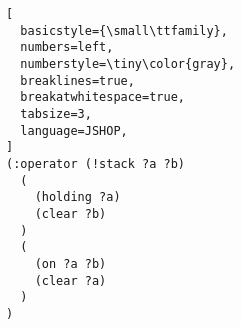 \begin{lstlisting}[
  basicstyle={\small\ttfamily},
  numbers=left,
  numberstyle=\tiny\color{gray},
  breaklines=true,
  breakatwhitespace=true,
  tabsize=3,
  language=JSHOP,
]
(:operator (!stack ?a ?b)
  (
    (holding ?a)
    (clear ?b)
  )
  (
    (on ?a ?b)
    (clear ?a)
  )
)
\end{lstlisting}